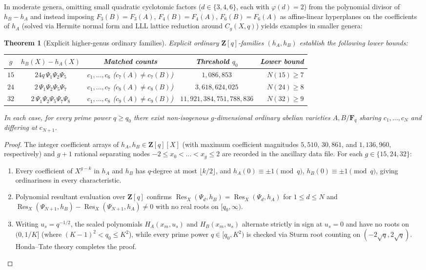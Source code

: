\documentclass[11pt]{amsart}
\newtheorem{theorem}{Theorem}[section]
\theoremstyle{remark}
\newcommand{\F}{\mathbf{F}}
\newcommand{\Z}{\mathbf{Z}}
\DeclareMathOperator{\Res}{Res}
\begin{document}
In moderate genera, omitting small quadratic cyclotomic factors ($d \in \{3, 4, 6\}$, each with $\varphi(d) = 2$) from the polynomial divisor of $h_B - h_A$ and instead imposing $F_3(B) = F_3(A)$, $F_4(B) = F_4(A)$, $F_6(B) = F_6(A)$ as affine-linear hyperplanes on the coefficients of $h_A$ (solved via Hermite normal form and LLL lattice reduction around $C_g(X, q)$) yields examples in smaller genera:

\begin{theorem}[Explicit higher-genus ordinary families]\label{thm:higher-families}
Explicit ordinary $\Z[q]$-families $(h_A, h_B)$ establish the following lower bounds:
\begin{center}
\begin{tabular}{@{}ccccr@{}}
\toprule
$g$ & $h_B(X) - h_A(X)$ & Matched counts & Threshold $q_0$ & Lower bound \\
\midrule
$15$ & $24 q\,\Psi_1\Psi_2\Psi_5$ & $c_1, \dots, c_6$ ($c_7(A) \ne c_7(B)$) & $1{,}086{,}853$ & $N(15) \ge 7$ \\
$24$ & $2\,\Psi_1\Psi_2\Psi_5\Psi_7$ & $c_1, \dots, c_7$ ($c_8(A) \ne c_8(B)$) & $3{,}618{,}624{,}025$ & $N(24) \ge 8$ \\
$32$ & $2\,\Psi_1\Psi_2\Psi_5\Psi_7\Psi_8$ & $c_1, \dots, c_8$ ($c_9(A) \ne c_9(B)$) & $11{,}921{,}384{,}751{,}788{,}836$ & $N(32) \ge 9$ \\
\bottomrule
\end{tabular}
\end{center}
In each case, for every prime power $q \ge q_0$ there exist non-isogenous $g$-dimensional ordinary abelian varieties $A, B / \F_q$ sharing $c_1, \dots, c_N$ and differing at $c_{N+1}$.
\end{theorem}

\begin{proof}
The integer coefficient arrays of $h_A, h_B \in \Z[q][X]$ (with maximum coefficient magnitudes $5{,}510$, $30{,}861$, and $1{,}136{,}960$, respectively) and $g + 1$ rational separating nodes $-2 \le x_0 < \dots < x_g \le 2$ are recorded in the ancillary data file. For each $g \in \{15, 24, 32\}$:
\begin{enumerate}
\item Every coefficient of $X^{g - k}$ in $h_A$ and $h_B$ has $q$-degree at most $\lfloor k/2 \rfloor$, and $h_A(0) \equiv \pm 1 \pmod{q}$, $h_B(0) \equiv \pm 1 \pmod{q}$, giving ordinariness in every characteristic.
\item Polynomial resultant evaluation over $\Z[q]$ confirms $\Res_X(\Psi_d, h_B) = \Res_X(\Psi_d, h_A)$ for $1 \le d \le N$ and $\Res_X(\Psi_{N+1}, h_B) - \Res_X(\Psi_{N+1}, h_A) \ne 0$ with no real roots on $[q_0, \infty)$.
\item Writing $u_s = q^{-1/2}$, the scaled polynomials $H_A(x_m, u_s)$ and $H_B(x_m, u_s)$ alternate strictly in sign at $u_s = 0$ and have no roots on $(0, 1/K]$ (where $(K - 1)^2 < q_0 \le K^2$), while every prime power $q \in [q_0, K^2)$ is checked via Sturm root counting on $(-2\sqrt{q}, 2\sqrt{q})$. Honda--Tate theory \cite{Tat71,How95} completes the proof.\qedhere
\end{enumerate}
\end{proof}
\end{document}
